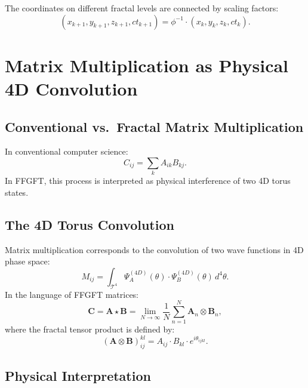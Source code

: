 The coordinates on different fractal levels are connected by scaling
factors:
\begin{equation}
  (x_{k+1}, y_{k+1}, z_{k+1}, ct_{k+1}) = \phi^{-1} \cdot
  (x_k, y_k, z_k, ct_k).
\end{equation}

\section{Matrix Multiplication as Physical 4D Convolution}

\subsection{Conventional vs.\ Fractal Matrix Multiplication}

In conventional computer science:
\begin{equation}
  C_{ij} = \sum_k A_{ik} B_{kj}.
\end{equation}
In FFGFT, this process is interpreted as physical interference of two
4D torus states.

\subsection{The 4D Torus Convolution}

Matrix multiplication corresponds to the convolution of two wave functions
in 4D phase space:
\begin{equation}
  M_{ij} = \int_{\mathcal{T}^4}
    \Psi_A^{(4D)}(\theta)\cdot\Psi_B^{(4D)}(\theta)\,d^4\theta.
\end{equation}
In the language of FFGFT matrices:
\begin{equation}
  \mathbf{C} = \mathbf{A} \star \mathbf{B}
  = \lim_{N\to\infty} \frac{1}{N}\sum_{n=1}^{N} \mathbf{A}_n \otimes \mathbf{B}_n,
\end{equation}
where the fractal tensor product is defined by:
\begin{equation}
  (\mathbf{A} \otimes \mathbf{B})_{ij}^{kl}
  = A_{ij} \cdot B_{kl} \cdot e^{i\theta_{ijkl}}.
\end{equation}

\subsection{Physical Interpretation}

